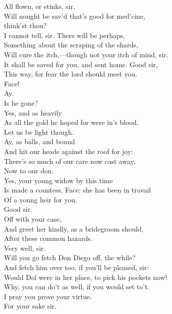 \documentclass[a4paper,oneside]{memoir}
\begin{document}
\begin{drama*}
\facespeaks {} All flown, or stinks, sir.\\
\mammonspeaks Will nought be sav'd that's good for med'cine,\\
think'st thou?\\
\facespeaks {} I cannot tell, sir. There will be perhaps,\\
Something about the scraping of the shards,\\
Will cure the itch,---though not your itch of mind, sir.\\
It shall be saved for you, and sent home. Good sir,\\
This way, for fear the lord should meet you.\\
\subtlespeaks {} Face!\\
\facespeaks {} Ay.\\
\subtlespeaks Is he gone?\\
\facespeaks {} Yes, and as heavily\\
As all the gold he hoped for were in's blood.\\
Let us be light though.\\
\subtlespeaks {} Ay, as balls, and bound\\
And hit our heads against the roof for joy:\\
There's so much of our care now cast away.\\
\facespeaks Now to our don.\\
\subtlespeaks {} Yes, your young widow by this time\\
Is made a countess, Face; she has been in travail\\
Of a young heir for you.\\
\facespeaks {} Good sir.\\
\subtlespeaks {} Off with your case,\\
And greet her kindly, as a bridegroom should,\\
After these common hazards.\\
\facespeaks {} Very well, sir.\\
Will you go fetch Don Diego off, the while?\\
\subtlespeaks And fetch him over too, if you'll be pleased, sir:\\
Would Dol were in her place, to pick his pockets now!\\
\facespeaks Why, you can do't as well, if you would set to't.\\
I pray you prove your virtue.\\
\subtlespeaks {} For your sake sir.\\
\scene


\end{drama*}
\end{document}
